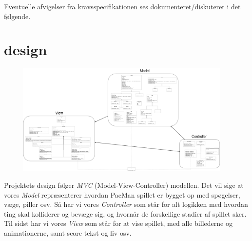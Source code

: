 \documentclass{article}
\theoremstyle{mytheoremstyle}
\theoremstyle{mytheoremstyle}
\theoremstyle{myproblemstyle}
\begin{document}
Eventuelle afvigelser fra kravsspecifikationen ses dokumenteret/diskuteret i det
følgende.
\newpage

\section{design}\label{sec:design} %

\begin{figure}[H]
    \begin{center}
        \includegraphics[width=0.95\textwidth]{figures/UML-diagram.png}
    \end{center}
    \caption{}
    \label{UML-diagram}
\end{figure}

Projektets design følger \textit{MVC} (Model-View-Controller) modellen. Det
vil sige at vores \textit{Model} repræsenterer hvordan PacMan spillet er bygget
op med spøgelser, væge, piller osv. Så har vi vores \textit{Controller} som står
for alt logikken med hvordan ting skal kolliderer og bevæge sig, og hvornår de
forskellige stadier af spillet sker. Til sidst har vi vores \textit{View} som
står for at vise spillet, med alle billederne og animationerne, samt score tekst
og liv osv.
\end{document}
